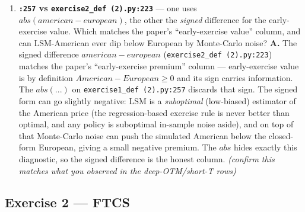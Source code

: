 \documentclass[
  11pt,
]{article}
\begin{document}
\begin{enumerate}
  regressor O(1) (around 0.9--1.1 for \(S≈36–44\), \(K=40\)) instead of
  O(40); raw monomials \(S, S², S³\) in absolute price would span
  \textasciitilde36 to \textasciitilde85k, producing a badly conditioned
  (near-collinear, huge-dynamic-range) design matrix and ill-conditioned
  normal equations. The Laguerre weight \texttt{exp(−x/2)} with the
  small normalised \(x\) keeps the basis bounded and well-scaled; with
  raw \(S\) the weight \texttt{exp(−S/2)} would underflow to
  \textasciitilde{}\(exp(−18)≈10⁻⁸\) (or smaller), collapsing the basis
  to numerical zero. Normalising by \(K\) is exactly the rescaling
  Longstaff--Schwartz use to keep the regression well-conditioned.
\item
  \textbf{\texttt{:257} vs \texttt{exercise2\_def\ (2).py:223}} --- one
  uses \(abs(american-european)\), the other the \emph{signed}
  difference for the early-exercise value. Which matches the paper's
  ``early-exercise value'' column, and can LSM-American ever dip below
  European by Monte-Carlo noise? \textbf{A.} The signed difference
  \(american − european\) (\texttt{exercise2\_def\ (2).py:223}) matches
  the paper's ``early-exercise premium'' column --- early-exercise value
  is by definition \(American − European ≥ 0\) and its sign carries
  information. The \(abs(...)\) on \texttt{exercise1\_def\ (2).py:257}
  discards that sign. The signed form can go slightly negative: LSM is a
  \emph{suboptimal} (low-biased) estimator of the American price (the
  regression-based exercise rule is never better than optimal, and any
  policy is suboptimal in-sample noise aside), and on top of that
  Monte-Carlo noise can push the simulated American below the
  closed-form European, giving a small negative premium. The \(abs\)
  hides exactly this diagnostic, so the signed difference is the honest
  column. \emph{(confirm this matches what you observed in the
  deep-OTM/short-T rows)}
\end{enumerate}

\hypertarget{exercise-2-ftcs}{%
\subsection{Exercise 2 --- FTCS}\label{exercise-2-ftcs}}
\end{document}
